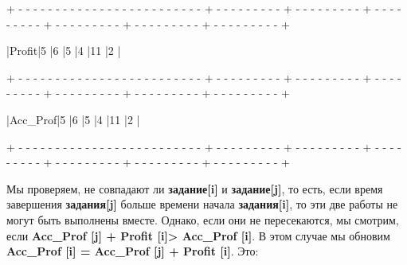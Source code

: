 \begin{tcolorbox}
{\tiny{+ - - - - - - - - - - - - - - - - - - - - - - - - - + - - - - - - - - - + - - - - - - - - - + - - - - - - - - - + - - - - - - - - - + - - - - - - - - - + - - - - - - - - - +}}

\hspace{0.4mm}|\hspace{17.6mm}Profit\hspace{17.6mm}|\hspace{7.1mm}5\hspace{7.1mm} |\hspace{7.1mm}6\hspace{7.1mm} |\hspace{7.1mm}5\hspace{7.1mm} |\hspace{7.1mm}4\hspace{7.1mm} |\hspace{5.8mm}11\hspace{5.8mm} |\hspace{7.1mm}2\hspace{7.1mm} |

{\tiny{+ - - - - - - - - - - - - - - - - - - - - - - - - - + - - - - - - - - - + - - - - - - - - - + - - - - - - - - - + - - - - - - - - - + - - - - - - - - - + - - - - - - - - - +}}

\hspace{0.4mm}|\hspace{14mm}Acc\_Prof\hspace{14mm}|\hspace{7.1mm}5\hspace{7.1mm} |\hspace{7.1mm}6\hspace{7.1mm} |\hspace{7.1mm}5\hspace{7.1mm} |\hspace{7.1mm}4\hspace{7.1mm} |\hspace{5.8mm}11\hspace{5.8mm} |\hspace{7.1mm}2\hspace{7.1mm} |

{\tiny{+ - - - - - - - - - - - - - - - - - - - - - - - - - + - - - - - - - - - + - - - - - - - - - + - - - - - - - - - + - - - - - - - - - + - - - - - - - - - + - - - - - - - - - +}}
\end{tcolorbox}

\vspace{\baselineskip}
Мы проверяем, не совпадают ли \textbf{задание[i]} и \textbf{задание[j]}, то есть, если время завершения \textbf{задания[j]} больше времени начала \textbf{задания[i]}, то эти две работы не могут быть выполнены вместе. Однако, если они не пересекаются, мы смотрим, если \textbf{Acc\_Prof [j] + Profit [i]> Acc\_Prof [i]}. В этом случае мы обновим \textbf{Acc\_Prof [i] = Acc\_Prof [j] + Profit [i]}. Это: 

